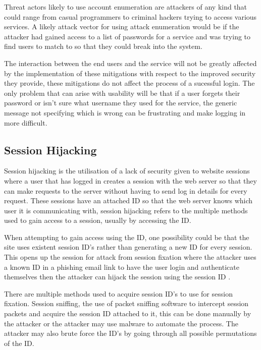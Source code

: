 \documentclass{ueacmpstyle}
\begin{document}
        Threat actors likely to use account enumeration are attackers of any kind that could 
        range from casual programmers to criminal hackers trying to access various services. 
        A likely attack vector for using attack enumeration would be if the attacker had 
        gained access to a list of passwords for a service and was trying to find users to 
        match to so that they could break into the system.

        The interaction between the end users and the service will not be greatly affected 
        by the implementation of these mitigations with respect to the improved security 
        they provide, these mitigations do not affect the process of a sucessful login. 
        The only problem that can arise with usability will be that if a user forgets their 
        password or isn't sure what username they used for the service, the generic message 
        not specifying which is wrong can be frustrating and make logging in more difficult. 

        \subsection{Session Hijacking}\label{sub:SessHijk}
        Session hijacking is the utilisation of a lack of security given to website sessions 
        where a user that has logged in creates a session with the web server so that they 
        can make requests to the server without having to send log in details for every 
        request. These sessions have an attached ID so that the web server knows which user 
        it is communicating with, session hijacking refers to the multiple methods used to 
        gain access to a session, usually by accessing the ID. 

        When attempting to gain access using the ID, one possibility could be that the site 
        uses existent session ID's rather than generating a new ID for every session. This 
        opens up the session for attack from session fixation where the attacker uses a 
        known ID in a phishing email link to have the user login and authenticate themselves 
        then the attacker can hijack the session using the session ID \citep{OWASPSessionFixation}.

        There are multiple methods used to acquire session ID's to use for session fixation. 
        Session sniffing, the use of packet sniffing software to intercept session packets 
        and acquire the session ID attached to it, this can be done manually by the attacker 
        or the attacker may use malware to automate the process. The attacker may also brute 
        force the ID's by going through all possible permutations of the ID.
\end{document}

